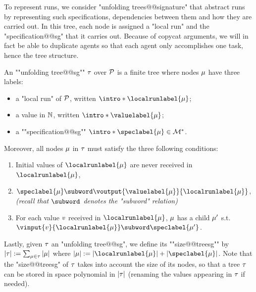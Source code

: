 To represent runs, we consider "unfolding trees@@signature" that abstract runs by representing such specifications, dependencies between them and how they are carried out. In this tree, each node is assigned a "local run" and the "specification@@sg" that it carries out. 
Because of copycat arguments, we will in fact be able to duplicate agents so that each agent only accomplishes one task, hence the tree structure.

\begin{definition}
\label{def:unfolding_tree_signature}
\AP An ""unfolding tree@@sg"" $\tau$ over $\mathcal{P}$ is
a finite tree where nodes $\mu$ have three labels:
\begin{itemize}
	\item a "local run" of $\mathcal{P}$, written $\intro*\localrunlabel{\node}$;
	
	\item a value in $\mathbb{N}$, written $\intro*\valuelabel{\node}$;
	
	\item a ""specification@@sg"" $\intro*\speclabel{\node} \in \messages^*$.
\end{itemize} 
Moreover, all nodes $\mu$ in $\tau$ must satisfy the three following conditions:
\begin{enumerate}[label= (\roman*), ref=(\roman*)]
	\item \label{item:condition1_initial_value_sg} Initial values of $\localrunlabel{\node}$ are never received in $\localrunlabel{\node}$,
	\item \label{item:condition3_boss_node_sg} $\speclabel{\node} \subword \voutput{\valuelabel{\node}}{\localrunlabel{\node}}$, \emph{(recall that $\subword$ denotes the "subword" relation)}
	\item \label{item:condition2_non_initial_value_sg} For each value $v$ received in $\localrunlabel{\node}$, $\mu$ has a child $\mu'$ s.t. $\vinput{\aval}{\localrunlabel{\node}} \subword \speclabel{\node'}$.
\end{enumerate}

\AP Lastly, given $\tau$ an "unfolding tree@@sg", we define its ""size@@treesg"" by $|\tau| := \sum_{\mu \in \tau} |\mu|$ where $\size{\node} := \size{\localrunlabel{\node}} + \size{\speclabel{\node}}$. Note that the "size@@treesg" of $\tau$ takes into account the size of its nodes, so that a tree $\tau$ can be stored in space polynomial in $|\tau|$ (renaming the values appearing in $\tau$ if needed). 
\end{definition}

